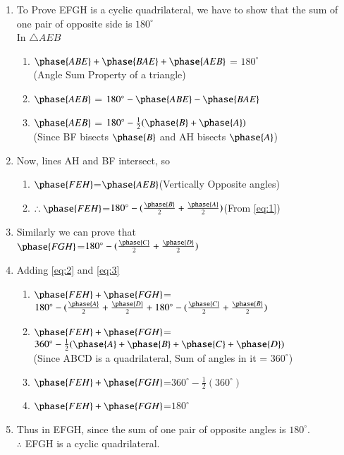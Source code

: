 
\renewcommand{\theequation}{\theenumi}
\begin{enumerate}[label=\thesection.\arabic*.,ref=\thesection.\theenumi]
	
\item To Prove EFGH is a cyclic quadrilateral, we have to show that the sum of one pair of opposite side is $180^{\circ}$
\\
In $\triangle AEB$
\begin{enumerate}
\item $\phase{ABE} +\phase{BAE}+\phase{AEB}$ = $180^{\circ}$
\\
(Angle Sum Property of a triangle)
\item $\phase{AEB}$ = $180^{\circ}-\phase{ABE}-\phase{BAE}$
\item $\phase{AEB}$ = $180^{\circ}-\frac{1}{2}(\phase{B}+\phase{A})$
\label{eq:1}
\\
(Since BF bisects $\phase{B}$ and AH bisects $\phase{A}$)
\end{enumerate}
%
\item Now, lines AH and BF intersect, so
\begin{enumerate}
\item $\phase{FEH}$=$\phase{AEB}$(Vertically Opposite angles)
\item $\therefore \phase{FEH}$=$180^{\circ}-(\frac{\phase{B}}{2}+\frac{\phase{A}}{2})$(From \ref{eq:1})
\label{eq:2}
\end{enumerate}
%
\item Similarly we can prove that 
\\
\label{eq:3}
$\phase{FGH}$=$180^{\circ}-(\frac{\phase{C}}{2}+\frac{\phase{D}}{2})$
\item Adding \eqref{eq:2} and \eqref{eq:3}
\begin{enumerate}
\item $\phase{FEH} + \phase{FGH}$=$180^{\circ}-(\frac{\phase{A}}{2}+\frac{\phase{D}}{2}+180^{\circ}-(\frac{\phase{C}}{2}+\frac{\phase{B}}{2})$
\item $\phase{FEH} + \phase{FGH}$=$360^{\circ}-\frac{1}{2}(\phase{A}+\phase{B}+\phase{C}+\phase{D})$
\\
(Since ABCD is a quadrilateral, Sum of angles in it = $360^{\circ}$)
\item $\phase{FEH} + \phase{FGH}$=$360^{\circ}-\frac{1}{2}(360^{\circ})$
\item $\phase{FEH} + \phase{FGH}$=$180^{\circ}$
\end{enumerate}
\item Thus in EFGH, since the sum of one pair of opposite angles is $180^{\circ}$.
\\
$\therefore$ EFGH is a cyclic quadrilateral.
\end{enumerate}